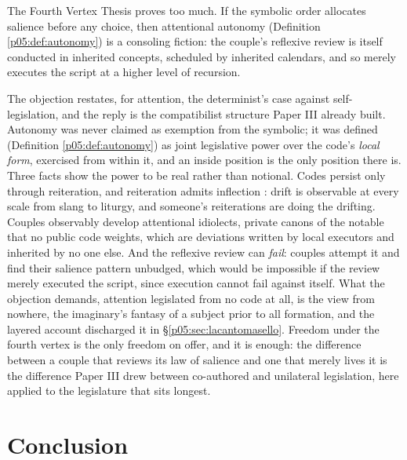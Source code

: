 \begin{objection}
The Fourth Vertex Thesis proves too much. If the symbolic order allocates salience before any choice, then attentional autonomy (Definition \ref{p05:def:autonomy}) is a consoling fiction: the couple's reflexive review is itself conducted in inherited concepts, scheduled by inherited calendars, and so merely executes the script at a higher level of recursion.
\end{objection}
\begin{reply}
The objection restates, for attention, the determinist's case against self-legislation, and the reply is the compatibilist structure Paper III already built. Autonomy was never claimed as exemption from the symbolic; it was defined (Definition \ref{p05:def:autonomy}) as joint legislative power over the code's \emph{local form}, exercised from within it, and an inside position is the only position there is. Three facts show the power to be real rather than notional. Codes persist only through reiteration, and reiteration admits inflection \parencite{butler1997}: drift is observable at every scale from slang to liturgy, and someone's reiterations are doing the drifting. Couples observably develop attentional idiolects, private canons of the notable that no public code weights, which are deviations written by local executors and inherited by no one else. And the reflexive review can \emph{fail}: couples attempt it and find their salience pattern unbudged, which would be impossible if the review merely executed the script, since execution cannot fail against itself. What the objection demands, attention legislated from no code at all, is the view from nowhere, the imaginary's fantasy of a subject prior to all formation, and the layered account discharged it in §\ref{p05:sec:lacantomasello}. Freedom under the fourth vertex is the only freedom on offer, and it is enough: the difference between a couple that reviews its law of salience and one that merely lives it is the difference Paper III drew between co-authored and unilateral legislation, here applied to the legislature that sits longest.
\end{reply}

\section{Conclusion}
\label{p05:sec:conclusion}

